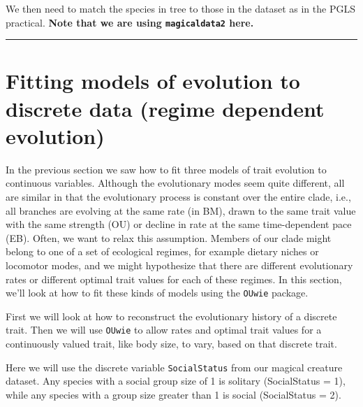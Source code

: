 \documentclass[]{book}
\newenvironment{Shaded}{\begin{snugshade}}{\end{snugshade}}
\newcommand{\KeywordTok}[1]{\textcolor[rgb]{0.13,0.29,0.53}{\textbf{{#1}}}}
\newcommand{\StringTok}[1]{\textcolor[rgb]{0.31,0.60,0.02}{{#1}}}
\newcommand{\NormalTok}[1]{{#1}}
\theoremstyle{definition}
\theoremstyle{definition}
\theoremstyle{definition}
\theoremstyle{remark}
\begin{document}
We then need to match the species in tree to those in the dataset as in
the PGLS practical. \textbf{Note that we are using \texttt{magicaldata2}
here.}

\begin{Shaded}
\end{Shaded}

\begin{center}\rule{0.5\linewidth}{\linethickness}\end{center}

\section{Fitting models of evolution to discrete data (regime dependent
evolution)}\label{fitting-models-of-evolution-to-discrete-data-regime-dependent-evolution}

In the previous section we saw how to fit three models of trait
evolution to continuous variables. Although the evolutionary modes seem
quite different, all are similar in that the evolutionary process is
constant over the entire clade, i.e., all branches are evolving at the
same rate (in BM), drawn to the same trait value with the same strength
(OU) or decline in rate at the same time-dependent pace (EB). Often, we
want to relax this assumption. Members of our clade might belong to one
of a set of ecological regimes, for example dietary niches or locomotor
modes, and we might hypothesize that there are different evolutionary
rates or different optimal trait values for each of these regimes. In
this section, we'll look at how to fit these kinds of models using the
\texttt{OUwie} package.

First we will look at how to reconstruct the evolutionary history of a
discrete trait. Then we will use \texttt{OUwie} to allow rates and
optimal trait values for a continuously valued trait, like body size, to
vary, based on that discrete trait.

Here we will use the discrete variable \texttt{SocialStatus} from our
magical creature dataset. Any species with a social group size of 1 is
solitary (SocialStatus = 1), while any species with a group size greater
than 1 is social (SocialStatus = 2).
\end{document}
